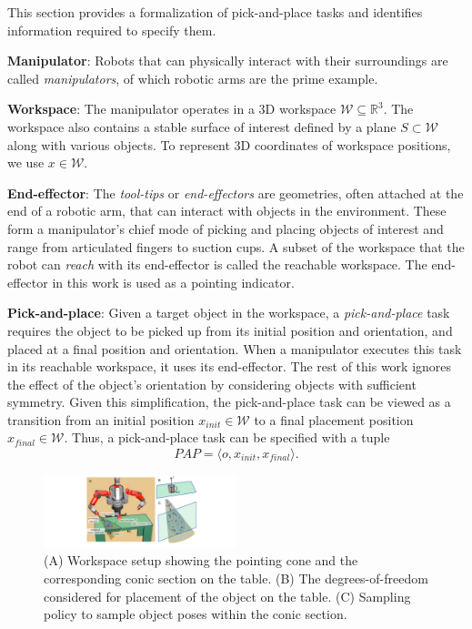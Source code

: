 \documentclass[letterpaper]{article} %
\newcommand{\xinit}{\ensuremath{x_{\textit{init}}}}
\newcommand{\xfinal}{\ensuremath{x_{\textit{final}}}}
\begin{document}
This section provides a formalization of pick-and-place tasks and identifies information required to specify them.
 
\noindent\textbf{Manipulator}: Robots that can physically interact with their surroundings are called \textit{manipulators}, of which robotic arms are the prime example. 

\noindent\textbf{Workspace}: The manipulator operates in a 3D workspace $\mathcal{W} \subseteq \mathbb{R}^3$. The workspace also contains a stable surface of interest defined by a plane $S\subset\mathcal{W}$ along with various objects. To represent 3D coordinates of workspace positions, we use $x\in\mathcal{W}$. 

\noindent\textbf{End-effector}: The \textit{tool-tips} or \textit{end-effectors} are geometries, often attached at the end of a robotic arm, that can interact with objects in the environment. These form a manipulator's chief mode of picking and placing objects of interest and range from articulated fingers to suction cups. A subset of the workspace that the robot can \textit{reach} with its end-effector is called the reachable workspace. The end-effector in this work is used as a pointing indicator.

\noindent\textbf{Pick-and-place}: Given a target object in the workspace, a \textit{pick-and-place} task requires the object to be picked up from its initial position and orientation, and placed at a final position and orientation. When a manipulator executes this task in its reachable workspace, it uses its end-effector. 
The rest of this work ignores the effect of the object's orientation by considering objects with sufficient symmetry. Given this simplification, the pick-and-place task can be viewed as a transition from an initial position $\xinit\in\mathcal{W}$ to a final placement position $\xfinal\in\mathcal{W}$.  Thus, a pick-and-place task can be specified with a tuple
$$ \textit{PAP} = \langle o, \xinit, \xfinal \rangle. $$


\begin{figure}[t]
\centering
\includegraphics[width=0.5\textwidth]{pointing_diagram.pdf}
\caption{(A) Workspace setup showing the pointing cone and the corresponding conic section on the table. (B) The degrees-of-freedom considered for placement of the object on the table. (C) Sampling policy to sample object poses within the conic section.}
    \label{fig:pointing}
\end{figure}
\end{document}

